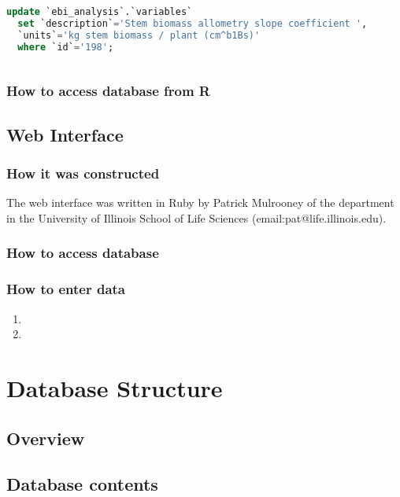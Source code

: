 \begin{enumerate}
\begin{lstlisting}[language=SQL]
  update `ebi_analysis`.`variables` 
  set `description`='Stem biomass allometry slope coefficient ', 
  `units`='kg stem biomass / plant (cm^b1Bs)' 
  where `id`='198';
\end{lstlisting}

\begin{lstlisting}[language=SQL]
\end{lstlisting}



\subsection{How to access database from R}

\section{Web Interface}
\subsection{How it was constructed}
The web interface was written in Ruby by Patrick Mulrooney of the department in the University of Illinois School of Life Sciences (email:pat@life.illinois.edu). 
\subsection{How to access database}
\subsection{How to enter data}


\begin{enumerate}
\item
\item
\end{enumerate}


\chapter{Database Structure}

\section{Overview}


\section{Database contents}



\end{enumerate}
